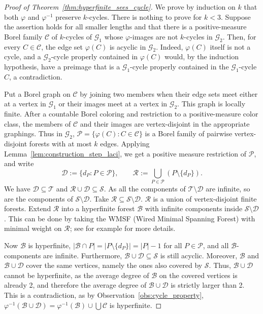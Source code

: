 \documentclass{article}
\theoremstyle{plain}
\theoremstyle{definition}
\newcommand{\cB}{\mathcal{B}}
\newcommand{\cG}{\mathcal{G}}
\newcommand{\cS}{\mathcal{S}}
\newcommand{\mP}{\mathscr P}
\newcommand{\cT}{\mathcal{T}}
\newcommand{\cR}{\mathcal{R}}
\begin{document}
\begin{proof}[Proof of Theorem~\ref{thm:hyperfinite_sees_cycle}]
We prove by induction on $k$ that both $\varphi$ and $\varphi^{-1}$ preserve $k$-cycles. There is nothing to prove for $k<3$. Suppose the
assertion holds for all smaller lengths and that there is a positive-measure Borel family $\mathscr C$ of $k$-cycles of
$\cG_1$ whose $\varphi$-images are not $k$-cycles in $\cG_2$. Then, for every $C\in\mathscr C$, the
edge set $\varphi(C)$ is acyclic in $\cG_2$.  Indeed, $\varphi(C)$ itself is not a cycle, and a $\cG_2$-cycle properly
contained in $\varphi(C)$ would, by the induction hypothesis, have a preimage that is a $\cG_1$-cycle
properly contained in the $\cG_1$-cycle $C$, a contradiction.

Put a Borel graph on $\mathscr C$ by joining two members when their edge
sets meet either at a vertex in $\cG_1$ or their images meet at a vertex in $\cG_2$.  This graph is locally
finite.  After a countable Borel coloring and restriction to a
positive-measure color class, the members of $\mathscr C$  and their images are vertex-disjoint in the appropriate graphings. Thus  in $\cG_2$, $\mP=\{\varphi(C) : C \in \mathscr C\}$
is a Borel family of pairwise vertex-disjoint forests with at most $k$ edges. Applying Lemma~\ref{lem:construction_step_laci}, we get a positive measure restriction of $\mP$, and write
\[
    \mathcal{D}:=\{d_P:P\in\mP\},
    \qquad
    \cR:=\bigcup_{P\in\mathscr P}(P\setminus\{d_P\}).
\]
We have $\mathcal{D}\subseteq \cT$ and $\cR \cup \mathcal{D} \subseteq \cS$. As all the components of $\cT\setminus \mathcal{D}$ are infinite, so are the components of $\cS\setminus \mathcal{D}$. Take $\cR\subseteq \cS\setminus \mathcal{D}$. $\cR$ is a union of vertex-disjoint finite forests. Extend $\cR$ into a hyperfinite forest $\cB$ with infinite components inside $\cS\setminus \mathcal{D}$. This can be done by taking the WMSF (Wired Minimal Spanning Forest) with minimal weight on $\cR$; see for example \cite[Corollary 4.3]{berczi2026cycle} for more details.

Now $\cB$ is hyperfinite, $|\cB \cap P|=|P\setminus\{d_P\}|=|P|-1$ for all $P \in \mP$, and all $\cB$-components are infinite. Furthermore, $\cB\cup \mathcal{D}\subseteq \cS$ is still acyclic. Moreover, $\cB$ and $\cB \cup \mathcal{D}$ cover the same vertices, namely the ones also covered by $\cS$. Thus, $\cB \cup \mathcal{D}$ cannot be hyperfinite, as the average degree of $\cB$ on the covered vertices is already 2, and therefore the average degree of $\cB \cup \mathcal{D}$ is strictly larger than 2. This is a contradiction, as by Observation~\ref{obs:cycle_property},  $\varphi^{-1}(\cB\cup \mathcal{D})=\varphi^{-1}(\cB)\cup\bigcup \mathscr C$ is hyperfinite.    
\end{proof}
\end{document}
